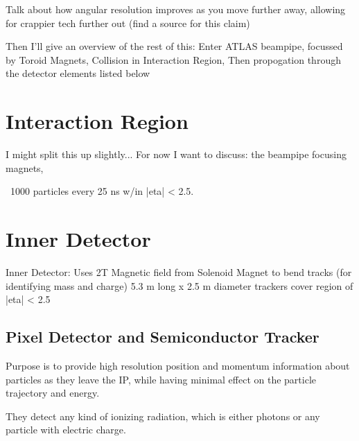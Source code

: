     Talk about how angular resolution improves as you move further away, allowing for crappier tech further out (find a source for this claim)

    Then I'll give an overview of the rest of this:
        Enter ATLAS beampipe,
        focussed by Toroid Magnets,
        Collision in Interaction Region,
        Then propogation through the detector elements listed below





\section{Interaction Region} %
    I might split this up slightly... For now I want to discuss:
        the beampipe focusing magnets,

    ~1000 particles every 25 ns w/in |eta| < 2.5.



\section{Inner Detector} %
    Inner Detector:
        Uses 2T Magnetic field from Solenoid Magnet to bend tracks (for identifying mass and charge)
        5.3 m long x 2.5 m diameter
        trackers cover region of |eta| < 2.5


    \subsection{Pixel Detector and Semiconductor Tracker}
        Purpose is to provide high resolution position and momentum information about particles as they leave the IP,
        while having minimal effect on the particle trajectory and energy.

        They detect any kind of ionizing radiation, which is either photons or any particle with electric charge.

